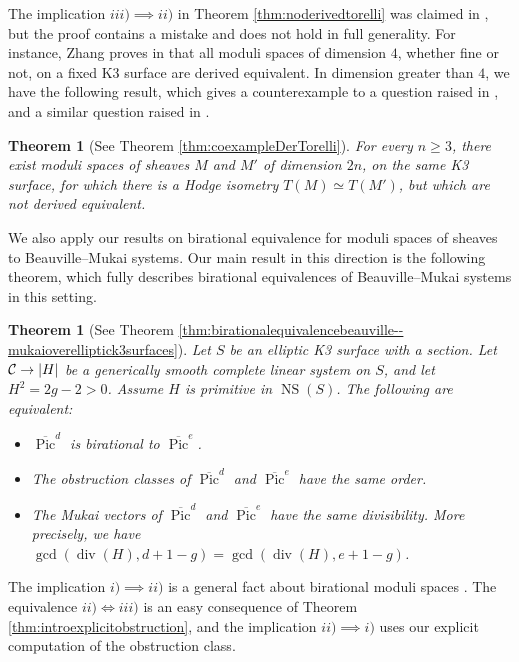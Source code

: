 \documentclass[11pt,twoside]{amsart}
\numberwithin{equation}{section}
\newtheorem{theorem}[dummy]{Theorem}
\theoremstyle{definition}
\theoremstyle{plain}
\def\NS{\operatorname{NS}}
\def\olPic{\overline{\operatorname{Pic}}}
\def\dv{\operatorname{div}}
\begin{document}
The implication $iii)\implies ii)$ in Theorem \ref{thm:noderivedtorelli} was claimed in \cite{Bec22}, but the proof contains a mistake and does not hold in full generality. For instance, Zhang proves in \cite[Corollary 1.5]{Ruxuan} that all moduli spaces of dimension $4$, whether fine or not, on a fixed K3 surface are derived equivalent. In dimension greater than $4$, we have the following result, which gives a counterexample to a question raised in \cite[Problem 1.1]{KK24}, and a similar question raised in \cite[Question 2]{PR23}.

\begin{theorem}[See Theorem \ref{thm:coexampleDerTorelli}]
    For every $n\geq 3$, there exist moduli spaces of sheaves $M$ and $M'$ of dimension $2n$, on the same K3 surface, for which there is a Hodge isometry $T(M)\simeq T(M')$, but which are not derived equivalent.
\end{theorem}

We also apply our results on birational equivalence for moduli spaces of sheaves to Beauville--Mukai systems. Our main result in this direction is the following theorem, which fully describes birational equivalences of Beauville--Mukai systems in this setting.
\begin{theorem}[See Theorem \ref{thm:birationalequivalencebeauville--mukaioverelliptick3surfaces}]
    Let $S$ be an elliptic K3 surface with a section. Let $\mathcal{C}\to |H|$ be a generically smooth complete linear system on $S$, and let $H^2 = 2g-2>0$. Assume $H$ is primitive in $\NS(S)$. The following are equivalent:
    \begin{itemize}
        \item[i)] $\olPic^d$ is birational to $\olPic^e$.
        \item[ii)] The obstruction classes of $\olPic^d$ and $\olPic^e$ have the same order. 
        \item[iii)] The Mukai vectors of $\olPic^d$ and $\olPic^e$ have the same divisibility. More precisely, we have $\gcd(\dv(H),d+1-g) = \gcd(\dv(H),e+1-g)$.
    \end{itemize}    
\end{theorem}

The implication $i)\implies ii)$ is a general fact about birational moduli spaces \cite[Proof of Lemma 9.10]{Bec22}. The equivalence $ii)\iff iii)$ is an easy consequence of Theorem \ref{thm:introexplicitobstruction}, and the implication $ii)\implies i)$ uses our explicit computation of the obstruction class.
\end{document}
